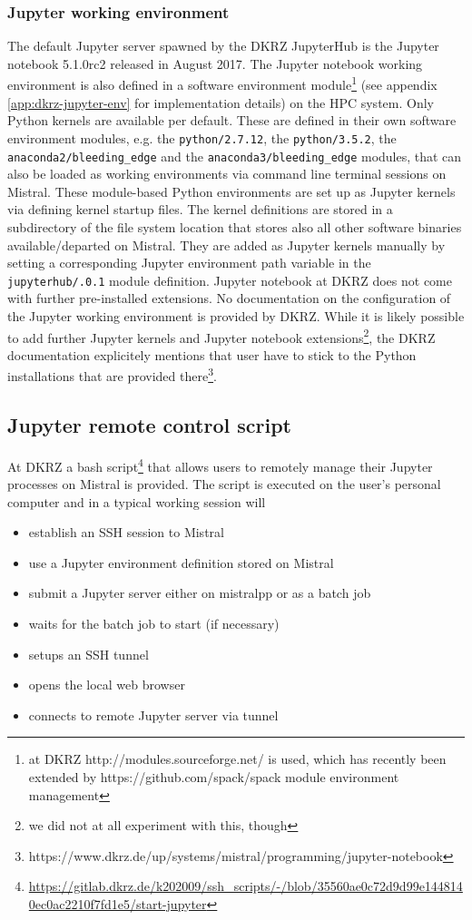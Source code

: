 \subsubsection{Jupyter working environment}

The default Jupyter server spawned by the DKRZ JupyterHub is the Jupyter notebook 5.1.0rc2 released in August 2017.
The Jupyter notebook working environment is also defined in a software environment module\footnote{at DKRZ http://modules.sourceforge.net/ is used, which has recently been extended by https://github.com/spack/spack module environment management} (see appendix \ref{app:dkrz-jupyter-env} for implementation details) on the HPC system.
Only Python kernels are available per default.
These are defined in their own software environment modules, e.g. the \verb|python/2.7.12|, the \verb|python/3.5.2|, the \verb|anaconda2/bleeding_edge| and the \verb|anaconda3/bleeding_edge| modules, that can also be loaded as working environments via command line terminal sessions on Mistral.
These module-based Python environments are set up as Jupyter kernels via defining kernel startup files.
The kernel definitions are stored in a subdirectory of the file system location that stores also all other software binaries available/departed on Mistral.
They are added as Jupyter kernels manually by setting a corresponding Jupyter environment path variable in the {\tt jupyterhub/.0.1} module definition.
Jupyter notebook at DKRZ does not come with further pre-installed extensions.
No documentation on the configuration of the Jupyter working environment is provided by DKRZ.
While it is likely possible to add further Jupyter kernels and Jupyter notebook extensions\footnote{we did not at all experiment with this, though}, the DKRZ documentation explicitely mentions that user have to stick to the Python installations that are provided there\footnote{https://www.dkrz.de/up/systems/mistral/programming/jupyter-notebook}.

\subsection{Jupyter remote control script}

At DKRZ a bash script\footnote{\url{https://gitlab.dkrz.de/k202009/ssh_scripts/-/blob/35560ae0c72d9d99e1448140ec0ac2210f7fd1e5/start-jupyter}} that allows users to remotely manage their Jupyter processes on Mistral is provided.
The script is executed on the user's personal computer and in a typical working session will
\begin{itemize}
    \item establish an SSH session to Mistral
    \item use a Jupyter environment definition stored on Mistral
    \item submit a Jupyter server either on mistralpp or as a batch job
    \item waits for the batch job to start (if necessary)
    \item setups an SSH tunnel
    \item opens the local web browser
    \item connects to remote Jupyter server via tunnel
\end{itemize}

